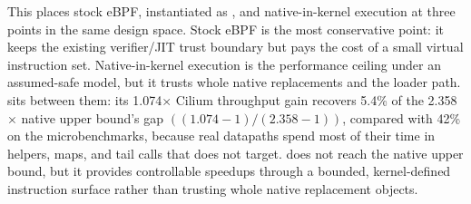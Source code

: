 This places stock eBPF, \tool instantiated as \lang, and native-in-kernel execution at three points in the same design space. Stock eBPF is the most conservative point: it keeps the existing verifier/JIT trust boundary but pays the cost of a small virtual instruction set. Native-in-kernel execution is the performance ceiling under an assumed-safe model, but it trusts whole native replacements and the loader path. \lang sits between them: its 1.074$\times$ Cilium throughput gain recovers 5.4\% of the 2.358$\times$ native upper bound's gap $((1.074{-}1)/(2.358{-}1))$, compared with 42\% on the microbenchmarks, because real datapaths spend most of their time in helpers, maps, and tail calls that \lang does not target. \lang does not reach the native upper bound, but it provides controllable speedups through a bounded, kernel-defined instruction surface rather than trusting whole native replacement objects.
